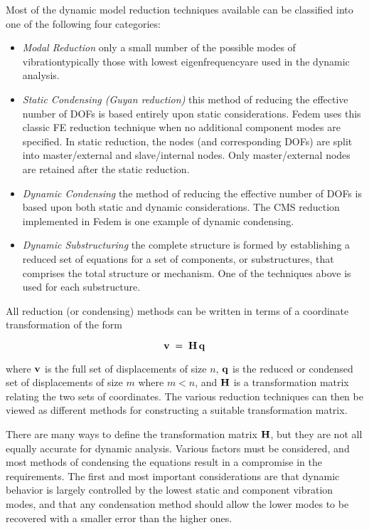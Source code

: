 Most of the dynamic model reduction techniques available can be classified into
one of the following four categories:
%
\begin{itemize}
\item \textit{Modal Reduction} \mdash only a small number of the possible modes
of vibration\mdash{}typically those with lowest eigenfrequency\mdash{}are used
in the dynamic analysis.
%
\item \textit{Static Condensing (Guyan reduction)} \mdash this method of reducing the effective
number of DOFs is based entirely upon static considerations. Fedem uses this classic FE reduction
technique when no additional component modes are specified. In static reduction, the nodes
(and corresponding DOFs) are split into master/external and slave/internal nodes. Only master/external
nodes are retained after the static reduction.
%
\item \textit{Dynamic Condensing} \mdash the method of reducing the effective number of DOFs
is based upon both static and dynamic considerations. The CMS reduction implemented in Fedem
is one example of dynamic condensing.
%
\item \textit{Dynamic Substructuring} \mdash the complete structure is formed by establishing
a reduced set of equations for a set of components, or substructures, that comprises the total
structure or mechanism. One of the techniques above is used for each substructure.
\end{itemize}

All reduction (or condensing) methods can be written in terms of a coordinate transformation
of the form

\begin{equation}
{\bf v} \;=\; {\bf H}\,{\bf q}
\end{equation}

\noindent
where $\bf v$ is the full set of displacements of size $n$, $\bf q$ is the reduced or condensed
set of displacements of size $m$ where $m < n$, and $\bf H$ is a transformation matrix relating
the two sets of coordinates. The various reduction techniques can then be viewed as different
methods for constructing a suitable transformation matrix.

There are many ways to define the transformation matrix $\bf H$, but they are not all equally
accurate for dynamic analysis. Various factors must be considered, and most methods of condensing
the equations result in a compromise in the requirements. The first and most important considerations
are that dynamic behavior is largely controlled by the lowest static and component vibration
modes, and that any condensation method should allow the lower modes to be recovered with a
smaller error than the higher ones.

